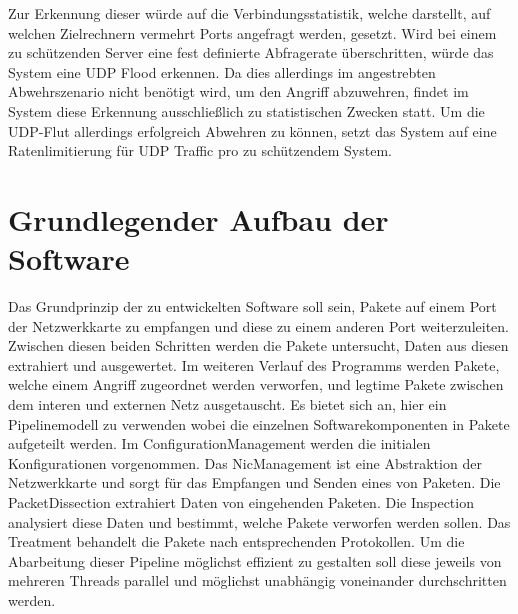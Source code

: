 \documentclass[../review_1.tex]{subfiles}
\begin{document}
Zur Erkennung dieser würde auf die Verbindungsstatistik, welche darstellt, auf welchen Zielrechnern vermehrt Ports angefragt werden, gesetzt. Wird bei einem zu schützenden Server eine fest definierte Abfragerate überschritten, würde das System eine UDP Flood erkennen. Da dies allerdings im angestrebten Abwehrszenario nicht benötigt wird, um den Angriff abzuwehren, findet im System diese Erkennung ausschließlich zu statistischen Zwecken statt. Um die UDP-Flut allerdings erfolgreich Abwehren zu können, setzt das System auf eine Ratenlimitierung für UDP Traffic pro zu schützendem System.

\section{Grundlegender Aufbau der Software} \label{section:basic_structure}
Das Grundprinzip der zu entwickelten Software soll sein, Pakete auf einem Port der Netzwerkkarte zu empfangen und diese zu einem anderen Port weiterzuleiten. Zwischen diesen beiden Schritten werden die Pakete untersucht, Daten aus diesen extrahiert und ausgewertet. Im weiteren Verlauf des Programms werden Pakete, welche einem Angriff zugeordnet werden verworfen, und legtime Pakete zwischen dem interen und externen Netz ausgetauscht. Es bietet sich an, hier ein Pipelinemodell zu verwenden wobei die einzelnen Softwarekomponenten in Pakete aufgeteilt werden. Im ConfigurationManagement werden die initialen Konfigurationen vorgenommen. Das NicManagement ist eine Abstraktion der Netzwerkkarte und sorgt für das Empfangen und Senden eines von Paketen. Die PacketDissection extrahiert Daten von eingehenden Paketen. Die Inspection analysiert diese Daten und bestimmt, welche Pakete verworfen werden sollen. Das Treatment behandelt die Pakete nach entsprechenden Protokollen. Um die Abarbeitung dieser Pipeline möglichst effizient zu gestalten soll diese jeweils von mehreren Threads parallel und möglichst unabhängig voneinander durchschritten werden.
\end{document}
